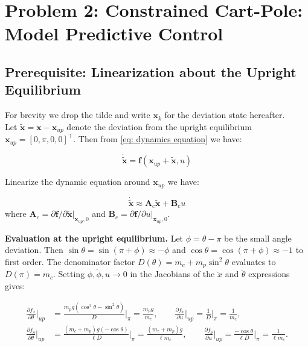 \section{Problem 2: Constrained Cart-Pole: Model Predictive Control}

\subsection*{Prerequisite: Linearization about the Upright Equilibrium}
For brevity we drop the tilde and write $\mathbf{x}_k$ for the deviation state hereafter.\\

Let $\tilde{\mathbf{x}} = \mathbf{x} - \mathbf{x}_{up}$ denote the deviation from the upright equilibrium $\mathbf{x}_{up} = [0,\pi,0,0]^\top$. Then from \ref{eq: dynamics equation} we have:

\begin{equation}
    \dot{\tilde{\mathbf{x}}} = \boldsymbol{f}(\mathbf{x}_{up} + \tilde{\mathbf{x}}, u)
\end{equation}

Linearize the dynamic equation around $\mathbf{x}_{up}$ we have:

\begin{equation}
    \dot{\tilde{\mathbf{x}}} \approx \boldsymbol{A}_c\tilde{\mathbf{x}} + \boldsymbol{B}_c u 
\end{equation}
where $\boldsymbol{A}_c = \partial\boldsymbol{f}/\partial\tilde{\mathbf{x}}\big|_{\mathbf{x}_{up},0}$ and $\boldsymbol{B}_c = \partial\boldsymbol{f}/\partial u\big|_{\mathbf{x}_{up},0}$.

\textbf{Evaluation at the upright equilibrium.} Let $\phi = \theta - \pi$ be the small angle deviation. Then $\sin\theta = \sin(\pi+\phi) \approx -\phi$ and $\cos\theta = \cos(\pi+\phi) \approx -1$ to first order. The denominator factor $D(\theta) = m_c + m_p\sin^2\theta$ evaluates to $D(\pi) = m_c$. Setting $\phi,\dot\phi,u \to 0$ in the Jacobians of the $\ddot{x}$ and $\ddot\theta$ expressions gives:

\begin{align*}
\frac{\partial f_{\ddot{x}}}{\partial\theta}\bigg|_{up}
  &= \frac{m_p g(\cos^2\theta-\sin^2\theta)}{D}\bigg|_{\pi}
   = \frac{m_p g}{m_c},
\qquad
\frac{\partial f_{\ddot{x}}}{\partial u}\bigg|_{up}
   = \frac{1}{D}\bigg|_{\pi}
   = \frac{1}{m_c},\\[4pt]
\frac{\partial f_{\ddot\theta}}{\partial\theta}\bigg|_{up}
  &= \frac{(m_c+m_p)g(-\cos\theta)}{\ell D}\bigg|_{\pi}
   = \frac{(m_c+m_p)g}{\ell m_c},
\qquad
\frac{\partial f_{\ddot\theta}}{\partial u}\bigg|_{up}
   = \frac{-\cos\theta}{\ell D}\bigg|_{\pi}
   = \frac{1}{\ell m_c}.
\end{align*}

